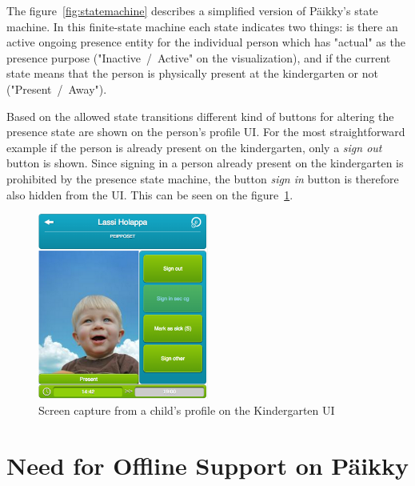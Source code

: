The figure~\ref{fig:statemachine} describes a simplified version of Päikky's state machine. In this finite-state machine each state indicates two things: is there an active ongoing presence entity for the individual person which has "actual" as the presence purpose ("Inactive~/~Active" on the visualization), and if the current state means that the person is physically present at the kindergarten or not ("Present~/~Away").

Based on the allowed state transitions different kind of buttons for altering the presence state are shown on the person's profile UI. For the most straightforward example if the person is already present on the kindergarten, only a \textit{sign out} button is shown. Since signing in a person already present on the kindergarten is prohibited by the presence state machine, the button \textit{sign in} button is therefore also hidden from the UI. This can be seen on the figure~\ref{fig:child-profile}. 


\begin{figure}[t]
\begin{center}
\includegraphics[width=0.5\textwidth]{assets/child-profile.png}
\end{center}
\caption{Screen capture from a child's profile on the Kindergarten UI}
\label{fig:child-profile}
\end{figure}







\section{Need for Offline Support on Päikky}
\label{sec:need-for-offline-support}

